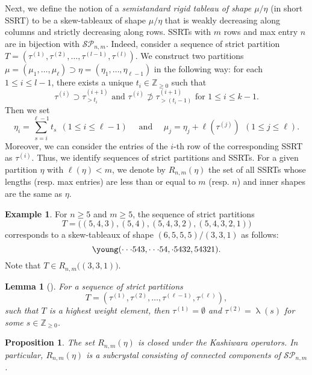 \documentclass[11pt, leqno]{amsart}
\theoremstyle{plain}
\newtheorem{lemma}[theorem]{Lemma}
\newtheorem{proposition}[theorem]{Proposition}
\theoremstyle{definition}
\newtheorem{example}[theorem]{Example}
\numberwithin{equation}{section}
\newcommand{\Z}{\mathbb{Z}}
\newcommand{\defn}[1]{{\color{darkred}\emph{#1}}} %
\begin{document}
Next, we define the notion of a \defn{semistandard rigid tableau of shape $\mu / \eta$} (in short SSRT) to be a skew-tableaux of shape $\mu / \eta$ that is weakly decreasing along columns and strictly decreasing along rows.
SSRTs with $m$ rows and max entry $n$ are in bijection with $\mathcal{SP}_{n,m}$. Indeed, consider a sequence of strict partition $T = (\tau^{(1)},\tau^{(2)},\ldots,\tau^{(l-1)},\tau^{(l)})$. We construct two partitions $\mu = (\mu_1,\ldots,\mu_\ell) \supset \eta = (\eta_1,\ldots,\eta_{\ell-1})$ in the following way: for each $1 \le i \le l-1$, there exists a unique $t_i \in \Z_{\ge 0}$ such that
\[
\tau^{(i)} \supset \tau^{(i+1)}_{>t_i} \text{ and } \tau^{(i)} \not \supset \tau^{(i+1)}_{>(t_i-1)} \text{ for } 1 \le i \le k-1.
\]
Then we set
\[
\eta_i = \displaystyle\sum_{s=i}^{\ell-1} t_s \ \ (1 \le i \le \ell-1) \quad \text{ and } \quad \mu_j = \eta_j +\ell(\tau^{(j)})\ \ (1 \le j \le \ell).
\]
Moreover, we can consider the entries of the $i$-th row of the corresponding SSRT as $\tau^{(i)}$.
Thus, we identify sequences of strict partitions and SSRTs.
For a given partition $\eta$ with $\ell(\eta)<m$, we denote by $R_{n,m}(\eta)$ the set of all SSRTs whose lengths (resp. max entries) are less than or equal to $m$ (resp. $n$) and
inner shapes are the same as $\eta$.

\begin{example}
For $n \ge 5$ and $m\ge 5$, the sequence of strict partitions
\[
T=\bigl( (5,4,3),(5,4),(5,4,3,2),(5,4,3,2,1) \bigr)
\]
corresponds to a skew-tableaux of shape $(6,5,5,5)/(3,3,1)$ as follows:
\[
\young(\cdot\cdot\cdot543,\cdot\cdot\cdot54,\cdot5432,54321).
\]
Note that $T \in R_{n,m}\bigl( (3,3,1) \bigr)$.
\end{example}

\begin{lemma}[{\cite[Lemma 6.1]{KLO17}}]
\label{lemma: general hw B}
For a sequence of strict partitions
\[
T=\left( \tau^{(1)},\tau^{(2)},\ldots,\tau^{(\ell-1)},\tau^{(\ell)} \right),
\]
such that $T$ is a highest weight element, then $\tau^{(1)}=\emptyset$ and $\tau^{(2)}=\uplambda(s)$ for some $s \in \Z_{\ge 0}$.
\end{lemma}

\begin{proposition}
\label{prop: same inner shape}
The set $R_{n,m}(\eta)$ is closed under the Kashiwara operators. In particular, $R_{n,m}(\eta)$ is a subcrystal consisting of connected components of $\mathcal{SP}_{n,m}$.
\end{proposition}
\end{document}
